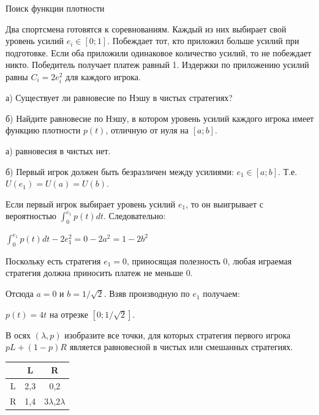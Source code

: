 \begin{problem}
 Поиск функции плотности \par
Два спортсмена готовятся к соревнованиям. Каждый из них выбирает
свой уровень усилий $e_{i}\in[0;1]$. Побеждает тот, кто приложил
больше усилий при подготовке. Если оба приложили одинаковое
количество усилий, то не побеждает никто. Победитель получает
платеж равный 1. Издержки по приложению усилий равны
$C_{i}=2e_{i}^{2}$ для каждого игрока. \par
а) Существует ли равновесие по Нэшу в чистых стратегиях? \par
б) Найдите равновесие по Нэшу, в котором уровень усилий каждого
игрока имеет функцию плотности $p(t)$, отличную от нуля на $[a;b]$.



\begin{sol}

а) равновесия в чистых нет. \par
б) Первый игрок должен быть безразличен между усилиями:
$e_{1}\in [a;b]$. Т.е. $U(e_{1})=U(a)=U(b)$. \par
Если первый игрок выбирает уровень усилий $e_{1}$, то он
выигрывает с вероятностью $\int_{0}^{e_{1}}p(t)dt$.
Следовательно: \par
$\int_{0}^{e_{1}}p(t)dt-2e_{1}^{2}=0-2a^{2}=1-2b^{2}$ \par
Поскольку есть стратегия $e_{1}=0$, приносящая полезность 0, любая
играемая стратегия должна приносить платеж не меньше 0. \par
Отсюда $a=0$ и $b=1/\sqrt{2}$.
Взяв производную по $e_{1}$ получаем: \par
$p(t)=4t$ на отрезке $[0;1/\sqrt{2}]$.
\end{sol}
\end{problem}



\begin{problem}
 В осях $(\lambda,p)$ изобразите все точки, для которых стратегия
первого игрока $pL+(1-p)R$ является равновесной в чистых или
смешанных стратегиях.

\begin{tabular}{|c|c|c|}
  \hline
   & L & R \\
  \hline
  L & 2,3 & 0,2 \\
  R & 1,4 & $3\lambda$,$2\lambda$ \\
  \hline
\end{tabular}



\begin{sol}

\end{sol}
\end{problem}




